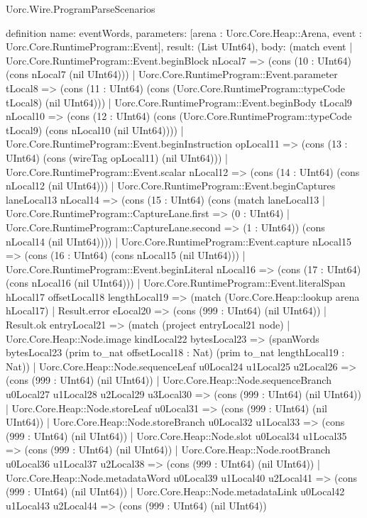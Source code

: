 \begin{lexlean}{Uorc.Wire.ProgramParseScenarios}
\begin{semanticmodule}
definition{
  name: eventWords,
  parameters: [arena : Uorc.Core.Heap::Arena, event : Uorc.Core.RuntimeProgram::Event],
  result: (List UInt64),
  body: (match event
    | Uorc.Core.RuntimeProgram::Event.beginBlock nLocal7 => (cons (10 : UInt64) (cons nLocal7 (nil UInt64)))
    | Uorc.Core.RuntimeProgram::Event.parameter tLocal8 => (cons (11 : UInt64) (cons (Uorc.Core.RuntimeProgram::typeCode tLocal8) (nil UInt64)))
    | Uorc.Core.RuntimeProgram::Event.beginBody tLocal9 nLocal10 => (cons (12 : UInt64) (cons (Uorc.Core.RuntimeProgram::typeCode tLocal9) (cons nLocal10 (nil UInt64))))
    | Uorc.Core.RuntimeProgram::Event.beginInstruction opLocal11 => (cons (13 : UInt64) (cons (wireTag opLocal11) (nil UInt64)))
    | Uorc.Core.RuntimeProgram::Event.scalar nLocal12 => (cons (14 : UInt64) (cons nLocal12 (nil UInt64)))
    | Uorc.Core.RuntimeProgram::Event.beginCaptures laneLocal13 nLocal14 => (cons (15 : UInt64) (cons (match laneLocal13
      | Uorc.Core.RuntimeProgram::CaptureLane.first => (0 : UInt64)
      | Uorc.Core.RuntimeProgram::CaptureLane.second => (1 : UInt64)) (cons nLocal14 (nil UInt64))))
    | Uorc.Core.RuntimeProgram::Event.capture nLocal15 => (cons (16 : UInt64) (cons nLocal15 (nil UInt64)))
    | Uorc.Core.RuntimeProgram::Event.beginLiteral nLocal16 => (cons (17 : UInt64) (cons nLocal16 (nil UInt64)))
    | Uorc.Core.RuntimeProgram::Event.literalSpan hLocal17 offsetLocal18 lengthLocal19 => (match (Uorc.Core.Heap::lookup arena hLocal17)
      | Result.error eLocal20 => (cons (999 : UInt64) (nil UInt64))
      | Result.ok entryLocal21 => (match (project entryLocal21 node)
        | Uorc.Core.Heap::Node.image kindLocal22 bytesLocal23 => (spanWords bytesLocal23 (prim to_nat offsetLocal18 : Nat) (prim to_nat lengthLocal19 : Nat))
        | Uorc.Core.Heap::Node.sequenceLeaf u0Local24 u1Local25 u2Local26 => (cons (999 : UInt64) (nil UInt64))
        | Uorc.Core.Heap::Node.sequenceBranch u0Local27 u1Local28 u2Local29 u3Local30 => (cons (999 : UInt64) (nil UInt64))
        | Uorc.Core.Heap::Node.storeLeaf u0Local31 => (cons (999 : UInt64) (nil UInt64))
        | Uorc.Core.Heap::Node.storeBranch u0Local32 u1Local33 => (cons (999 : UInt64) (nil UInt64))
        | Uorc.Core.Heap::Node.slot u0Local34 u1Local35 => (cons (999 : UInt64) (nil UInt64))
        | Uorc.Core.Heap::Node.rootBranch u0Local36 u1Local37 u2Local38 => (cons (999 : UInt64) (nil UInt64))
        | Uorc.Core.Heap::Node.metadataWord u0Local39 u1Local40 u2Local41 => (cons (999 : UInt64) (nil UInt64))
        | Uorc.Core.Heap::Node.metadataLink u0Local42 u1Local43 u2Local44 => (cons (999 : UInt64) (nil UInt64))
}
\end{semanticmodule}
\end{lexlean}
